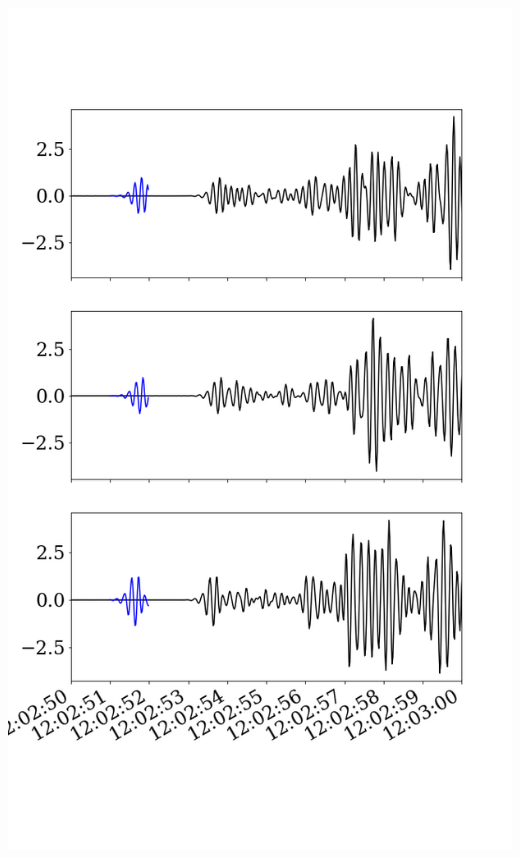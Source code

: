 \documentclass{beamer}
\begin{document}
\begin{frame}
\begin{minipage}{0.4\linewidth}
    \includegraphics[width=1.2\linewidth]{images/fig_1.png}
 \end{minipage}
 
\end{frame}
\end{document}
